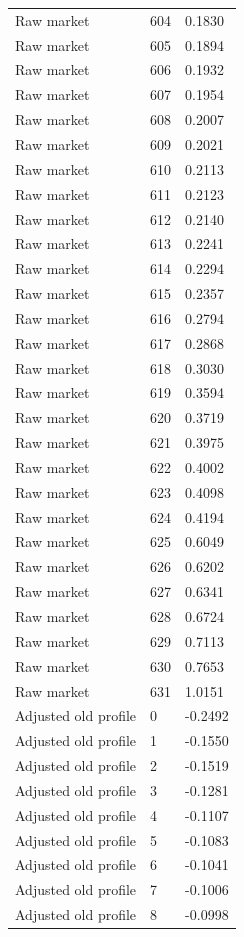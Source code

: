 \begin{table}[htbp]
\begin{tabular}{lll}
Raw market & 604 & 0.1830 \\
Raw market & 605 & 0.1894 \\
Raw market & 606 & 0.1932 \\
Raw market & 607 & 0.1954 \\
Raw market & 608 & 0.2007 \\
Raw market & 609 & 0.2021 \\
Raw market & 610 & 0.2113 \\
Raw market & 611 & 0.2123 \\
Raw market & 612 & 0.2140 \\
Raw market & 613 & 0.2241 \\
Raw market & 614 & 0.2294 \\
Raw market & 615 & 0.2357 \\
Raw market & 616 & 0.2794 \\
Raw market & 617 & 0.2868 \\
Raw market & 618 & 0.3030 \\
Raw market & 619 & 0.3594 \\
Raw market & 620 & 0.3719 \\
Raw market & 621 & 0.3975 \\
Raw market & 622 & 0.4002 \\
Raw market & 623 & 0.4098 \\
Raw market & 624 & 0.4194 \\
Raw market & 625 & 0.6049 \\
Raw market & 626 & 0.6202 \\
Raw market & 627 & 0.6341 \\
Raw market & 628 & 0.6724 \\
Raw market & 629 & 0.7113 \\
Raw market & 630 & 0.7653 \\
Raw market & 631 & 1.0151 \\
Adjusted old profile & 0 & -0.2492 \\
Adjusted old profile & 1 & -0.1550 \\
Adjusted old profile & 2 & -0.1519 \\
Adjusted old profile & 3 & -0.1281 \\
Adjusted old profile & 4 & -0.1107 \\
Adjusted old profile & 5 & -0.1083 \\
Adjusted old profile & 6 & -0.1041 \\
Adjusted old profile & 7 & -0.1006 \\
Adjusted old profile & 8 & -0.0998 \\

\end{tabular}
\end{table}
